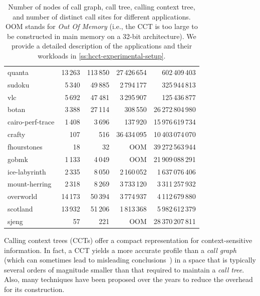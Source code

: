 \begin{table}[ht]
\begin{small}
\begin{tabular}{|l|r r r r|}
quanta & 13\,263 & 113\,850 & 27\,426\,654 & 602\,409\,403 \\
sudoku & 5\,340 & 49\,885 & 2\,794\,177 & 325\,944\,813 \\
vlc & 5\,692 & 47\,481 & 3\,295\,907 & 125\,436\,877 \\
\hline
\hline
botan & 3\,388 & 27\,114 & 308\,550 & 26\,272\,804\,980 \\
cairo-perf-trace & 1\,408 & 3\,696 & 137\,920 & 15\,976\,619\,734 \\
crafty & 107 & 516 & 36\,434\,095 & 10\,403\,074\,070 \\
fhourstones & 18 & 32 & OOM & 39\,272\,563\,944 \\
gobmk & 1\,133 & 4\,049 & OOM & 21\,909\,088\,291 \\
ice-labyrinth & 2\,335 & 8\,050 & 2\,160\,052 & 1\,637\,076\,406 \\
mount-herring & 2\,318 & 8\,269 & 3\,733\,120 & 3\,311\,257\,932 \\
overworld & 14\,173 & 50\,394 & 3\,774\,937 & 4\,112\,679\,880 \\
scotland & 13\,932 & 51\,206 & 1\,813\,368 & 5\,982\,612\,379 \\
sjeng & 57 & 221 & OOM & 28\,370\,207\,811 \\
\hline
\end{tabular}
\vspace{4mm}
\caption{\label{tab:hcct-CCTsize} Number of nodes of call graph, call tree, calling context tree, and number of distinct call sites for different applications. OOM stands for {\em Out Of Memory} (i.e., the CCT is too large to be constructed in main memory on a 32-bit architecture). We provide a detailed description of the applications and their workloads in \mysection\ref{ss:hcct-experimental-setup}.
}
\end{small}
\end{table}
\ifauthorea{\newline}{\vspace{-4mm}}

\noindent Calling context trees (CCTs) offer a compact representation for context-sensitive information. In fact, a CCT yields a more accurate profile than a {\em call graph} (which can sometimes lead to misleading conclusions~\cite{Ponder88, Spivey04}) in a space that is typically several orders of magnitude smaller than
that
required to maintain a {\em call tree}. Also, many techniques have been proposed over the years to reduce the overhead for its construction.

